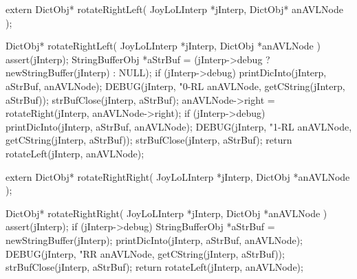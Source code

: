 \startCHeader
extern DictObj* rotateRightLeft(
  JoyLoLInterp *jInterp,
  DictObj* anAVLNode
);
\stopCHeader

\startCCode
DictObj* rotateRightLeft(
  JoyLoLInterp *jInterp,
  DictObj      *anAVLNode
) {
  assert(jInterp);
  StringBufferObj *aStrBuf =
    (jInterp->debug ? newStringBuffer(jInterp) : NULL);
  if (jInterp->debug) {
    printDicInto(jInterp, aStrBuf, anAVLNode);
    DEBUG(jInterp, "0-RL %
      anAVLNode, getCString(jInterp, aStrBuf));
    strBufClose(jInterp, aStrBuf);
  }
  anAVLNode->right = rotateRight(jInterp, anAVLNode->right);
  if (jInterp->debug) {
    printDicInto(jInterp, aStrBuf, anAVLNode);
    DEBUG(jInterp, "1-RL %
      anAVLNode, getCString(jInterp, aStrBuf));
    strBufClose(jInterp, aStrBuf);
  }
  return rotateLeft(jInterp, anAVLNode);
}
\stopCCode

\startCHeader
extern DictObj* rotateRightRight(
  JoyLoLInterp *jInterp,
  DictObj      *anAVLNode
);
\stopCHeader

\startCCode
DictObj* rotateRightRight(
  JoyLoLInterp *jInterp,
  DictObj      *anAVLNode
) {
  assert(jInterp);
  if (jInterp->debug) {
    StringBufferObj *aStrBuf = newStringBuffer(jInterp);
    printDicInto(jInterp, aStrBuf, anAVLNode);
    DEBUG(jInterp, "RR %
      anAVLNode, getCString(jInterp, aStrBuf));
    strBufClose(jInterp, aStrBuf);
  }
  return rotateLeft(jInterp, anAVLNode);
}
\stopCCode

